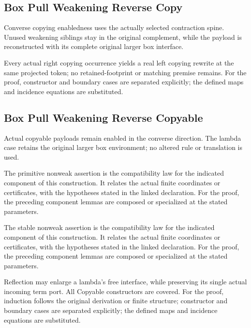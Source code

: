 \subsection{Box Pull Weakening Reverse Copy}
Converse copying enabledness uses the actually selected contraction spine. Unused weakening siblings stay in the original complement, while the payload is reconstructed with its complete original larger box interface.

Every actual right copying occurrence yields a real left copying rewrite at the same projected token; no retained-footprint or matching premise remains.
For the proof, constructor and boundary cases are separated explicitly; the defined maps and incidence equations are substituted.
\par{}

\subsection{Box Pull Weakening Reverse Copyable}
Actual copyable payloads remain enabled in the converse direction. The lambda case retains the original larger box environment; no altered rule or translation is used.

The primitive nonweak assertion is the compatibility law for the indicated component of this construction. It relates the actual finite coordinates or certificates, with the hypotheses stated in the linked declaration.
For the proof, the preceding component lemmas are composed or specialized at the stated parameters.
\par{}

The stable nonweak assertion is the compatibility law for the indicated component of this construction. It relates the actual finite coordinates or certificates, with the hypotheses stated in the linked declaration.
For the proof, the preceding component lemmas are composed or specialized at the stated parameters.
\par{}

Reflection may enlarge a lambda's free interface, while preserving its single actual incoming term port. All Copyable constructors are covered.
For the proof, induction follows the original derivation or finite structure; constructor and boundary cases are separated explicitly; the defined maps and incidence equations are substituted.
\par{}

